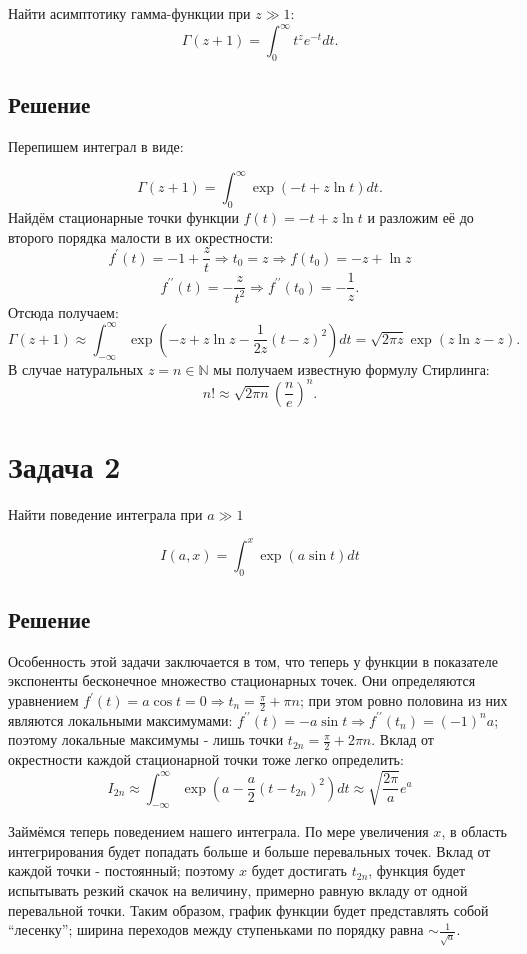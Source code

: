 \documentclass[a4paper,12pt]{article}
\begin{document}
Найти асимптотику гамма-функции при $z\gg1$: 
\[
\Gamma(z+1)=\int_{0}^{\infty}t^z e^{-t} dt.
\]


\subsection*{Решение}
Перепишем интеграл в виде:

\[
\Gamma(z+1)=\int_0^{\infty}\exp(-t+z\ln t) dt.
\]
Найдём стационарные точки функции $f(t)=-t+z\ln t$ и разложим её до второго порядка малости в их окрестности:
\[
f^{\prime}(t)=-1+\frac{z}{t}\Rightarrow t_0=z \Rightarrow f(t_0)=-z+\ln z
\]
\[
f^{\prime\prime}(t)=-\frac{z}{t^2}\Rightarrow f^{\prime\prime}(t_0)=-\frac{1}{z}.
\]
Отсюда получаем:
\[
\Gamma(z+1)\approx\int_{-\infty}^{\infty}\exp\left(-z+z\ln z-\frac{1}{2z}(t-z)^2\right)dt=\sqrt{2\pi z}\exp(z\ln z -z).
\]
В случае натуральных $z=n\in\mathbb{N}$ мы получаем известную формулу Стирлинга:
\[
n!\approx\sqrt{2\pi n}\left(\frac{n}{e}\right)^n.
\]

\section*{Задача 2}

Найти поведение интеграла при $a \gg 1$

\[
I(a,x)=\int_{0}^{x}\exp(a\sin t)dt
\]


\subsection*{Решение}

Особенность этой задачи заключается в том, что теперь у функции в
показателе экспоненты бесконечное множество стационарных точек. Они
определяются уравнением $f^{\prime}(t)=a\cos t=0\Rightarrow t_{n}=\frac{\pi}{2}+\pi n$;
при этом ровно половина из них являются локальными максимумами: $f^{\prime\prime}(t)=-a\sin t\Rightarrow f^{\prime\prime}(t_{n})=\left(-1\right)^{n}a$;
поэтому локальные максимумы - лишь точки $t_{2n}=\frac{\pi}{2}+2\pi n$.
Вклад от окрестности каждой стационарной точки тоже легко определить:
\[
I_{2n}\approx\int_{-\infty}^{\infty}\exp(a-\frac{a}{2}(t-t_{2n})^{2})dt\approx\sqrt{\frac{2\pi}{a}}e^{a}
\]

\noindent
Займёмся теперь поведением нашего интеграла. По мере увеличения $x$,
в область интегрирования будет попадать больше и больше перевальных
точек. Вклад от каждой точки - постоянный; поэтому $x$ будет достигать
$t_{2n}$, функция будет испытывать резкий скачок на величину, примерно
равную вкладу от одной перевальной точки. Таким образом, график функции
будет представлять собой ``лесенку''; ширина переходов между ступеньками по порядку равна
 $\sim\frac{1}{\sqrt{a}}$.
\end{document}
